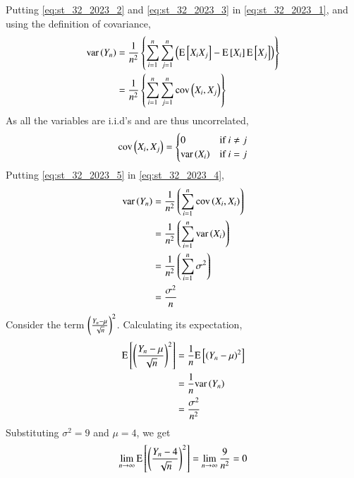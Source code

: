 \documentclass[journal,12pt,twocolumn]{IEEEtran}
\theoremstyle{remark}
\begin{document}
Putting \eqref{eq:st_32_2023_2} and \eqref{eq:st_32_2023_3} in \eqref{eq:st_32_2023_1}, and using the definition of covariance,
\begin{align}
    \text{var}\left(Y_n\right) &= \frac{1}{n^2} \left\{\sum_{i=1}^{n} \sum_{j=1}^{n} \left(\text{E}{}\left[X_iX_j\right] - \text{E}{}\left[X_i\right] \text{E}{}\left[X_j\right]\right)\right\}\\
    &= \frac{1}{n^2} \left\{\sum_{i=1}^{n} \sum_{j=1}^{n} \text{cov}\left(X_i, X_j\right)\right\} \label{eq:st_32_2023_4}
\end{align}
As all the variables are i.i.d's and are thus uncorrelated,
\begin{align}
    \text{cov}\left(X_i, X_j\right) =
    \begin{cases}
        0 & \text{if } i \ne j\\
        \text{var}\left(X_i\right) & \text{if } i = j
    \end{cases}\label{eq:st_32_2023_5}
\end{align}
Putting \eqref{eq:st_32_2023_5} in \eqref{eq:st_32_2023_4},
\begin{align}
    \text{var}\left(Y_n\right) &= \frac{1}{n^2} \left(\sum_{i=1}^{n} \text{cov}\left(X_i, X_i\right)\right)\\
     &= \frac{1}{n^2} \left(\sum_{i=1}^{n} \text{var}\left(X_i\right)\right)\\
     &= \frac{1}{n^2} \left(\sum_{i=1}^{n} \sigma^2\right)\\
     &= \frac{\sigma^2}{n}
\end{align}
Consider the term $\left(\frac{Y_n - \mu}{\sqrt{n}}\right)^2$. Calculating its expectation,
\begin{align}
    \text{E}{}\left[\left(\frac{Y_n - \mu}{\sqrt{n}}\right)^2\right] &= \frac{1}{n} \text{E}{}\left[\left(Y_n - \mu\right)^2\right]\\
    &= \frac{1}{n} \text{var}\left(Y_n\right)\\
    &= \frac{\sigma^2}{n^2}
\end{align}
Substituting $\sigma^2 = 9$ and $\mu = 4$, we get
\begin{align}
    \lim\limits_{n \to \infty} \text{E}{}\left[\left(\frac{Y_n - 4}{\sqrt{n}}\right)^2\right]
    = \lim\limits_{n \to \infty} \frac{9}{n^2} = 0
\end{align}
\end{document}
